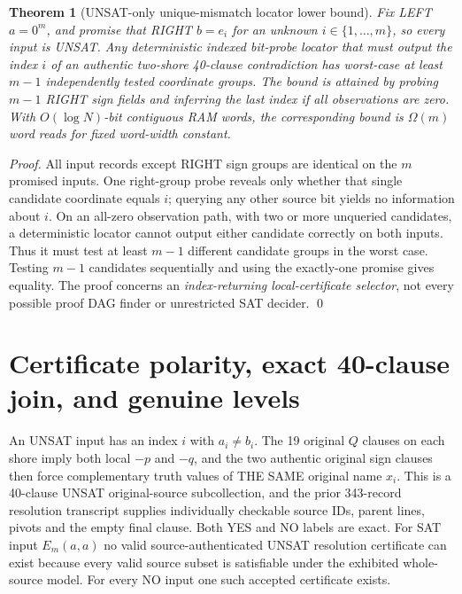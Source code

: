 \documentclass[11pt]{article}
\newtheorem{theorem}{Theorem}
\begin{document}
\begin{theorem}[UNSAT-only unique-mismatch locator lower bound]
\label{th:no}
Fix LEFT $a=0^m$, and promise that RIGHT $b=e_i$ for an unknown
$i\in\{1,\ldots,m\}$, so \emph{every} input is UNSAT.
Any deterministic indexed bit-probe locator that must output
the index $i$ of an authentic two-shore 40-clause contradiction
has worst-case at least $m-1$ independently tested coordinate groups.
The bound is attained by probing $m-1$ RIGHT sign fields and inferring
the last index if all observations are zero. With $O(\log N)$-bit
contiguous RAM words, the corresponding bound is $\Omega(m)$ word reads
for fixed word-width constant.
\end{theorem}
\begin{proof}
All input records except RIGHT sign groups are identical on the
$m$ promised inputs. One right-group probe reveals only whether that
single candidate coordinate equals $i$; querying any other source
bit yields no information about $i$. On an all-zero observation path,
with two or more unqueried candidates, a deterministic locator cannot
output either candidate correctly on both inputs. Thus it must test
at least $m-1$ different candidate groups in the worst case.
Testing $m-1$ candidates sequentially and using the exactly-one
promise gives equality. The proof concerns an \emph{index-returning
local-certificate selector}, not every possible proof DAG finder
or unrestricted SAT decider. \qed
\end{proof}

\section{Certificate polarity, exact 40-clause join, and genuine levels}
An UNSAT input has an index $i$ with $a_i\ne b_i$.
The 19 original $Q$ clauses on each shore imply both local
$-\!p$ and $-\!q$, and the two authentic original sign clauses then
force complementary truth values of THE SAME original name $x_i$.
This is a 40-clause UNSAT original-source subcollection,
and the prior 343-record resolution transcript supplies
individually checkable source IDs, parent lines, pivots and the
empty final clause. Both YES and NO labels are exact.
For SAT input $E_m(a,a)$ no valid source-authenticated UNSAT
resolution certificate can exist because every valid source subset
is satisfiable under the exhibited whole-source model.
For every NO input one such accepted certificate exists.
\end{document}
